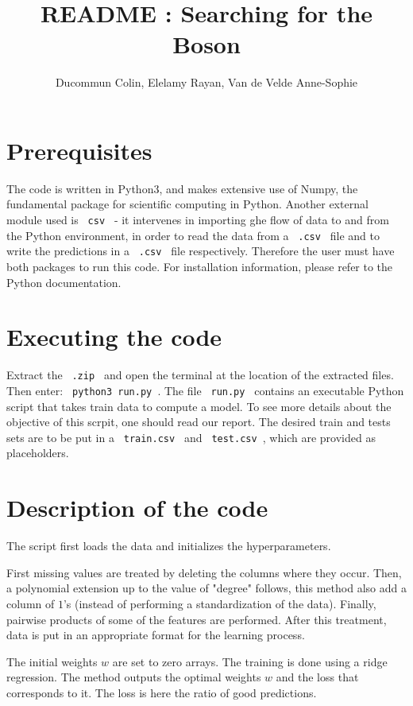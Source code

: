 \documentclass[11pt, oneside]{article}   	%
\title{README : Searching for the Boson}
\author{Ducommun Colin, Elelamy Rayan, Van de Velde Anne-Sophie}
\date{}
\begin{document}
\maketitle

\section{Prerequisites}

The code is written in Python3, and makes extensive use of Numpy, the fundamental package for scientific computing in Python. Another external module used is \lstinline" csv " - it intervenes in importing ghe flow of data to and from the Python environment, in order to read the data from a \lstinline" .csv " file and to write the predictions in a \lstinline" .csv " file respectively. Therefore the user must have both packages to run this code. For installation information, please refer to the Python documentation. 

\section{Executing the code}

Extract the \lstinline" .zip " and open the terminal at the location of the extracted files. Then enter: \lstinline" python3 run.py ". The file \lstinline" run.py " contains an executable Python script that takes train data to compute a model. To see more details about the objective of this scrpit, one should read our report. The desired train and tests sets are to be put in a \lstinline" train.csv " and \lstinline" test.csv ", which are provided as placeholders. 

\section{Description of the code}

The script first loads the data and initializes the hyperparameters. 

First missing values are treated by deleting the columns where they occur. Then, a polynomial extension up to the value of "degree" follows, this method also add a column of $1$'s (instead of performing a standardization of the data). Finally, pairwise products of some of the features are performed. After this treatment, data is put in an appropriate format for the learning process.

The initial weights $w$ are set to zero arrays. The training is done using a ridge regression. The method outputs the optimal weights $w$ and the loss that corresponds to it. The loss is here the ratio of good predictions.
\end{document}
